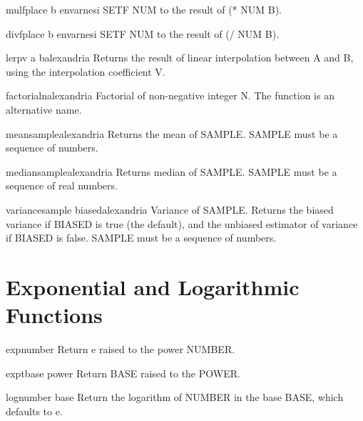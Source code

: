 \begin{macro}{mulf}{place b \env env}{arnesi}{}
  SETF NUM to the result of (* NUM B).
\end{macro}

\begin{macro}{divf}{place b \env env}{arnesi}{}
  SETF NUM to the result of (/ NUM B).
\end{macro}

\begin{function}{lerp}{v a b}{alexandria}{}
  Returns the result of linear interpolation between A and B, using the
interpolation coefficient V.
\end{function}

\begin{function}{factorial}{n}{alexandria}{}
  Factorial of non-negative integer N. The function \fun{!} is an
  alternative name.
\end{function}

\begin{function}{mean}{sample}{alexandria}{}
  Returns the mean of SAMPLE. SAMPLE must be a sequence of numbers.
\end{function}

\begin{function}{median}{sample}{alexandria}{}
  Returns median of SAMPLE. SAMPLE must be a sequence of real numbers.
\end{function}

\begin{function}{variance}{sample \key biased}{alexandria}{}
  Variance of SAMPLE. Returns the biased variance if BIASED is true (the default),
and the unbiased estimator of variance if BIASED is false. SAMPLE must be a
sequence of numbers.
\end{function}

\section{Exponential and Logarithmic Functions}
\label{sec:expon-logar-funct}

\begin{function}{exp}{number}{}{}
  Return e raised to the power NUMBER.
\end{function}

\begin{function}{expt}{base power}{}{}
  Return BASE raised to the POWER.
\end{function}

\begin{function}{log}{number \op base}{}{}
  Return the logarithm of NUMBER in the base BASE, which defaults to e.
\end{function}

